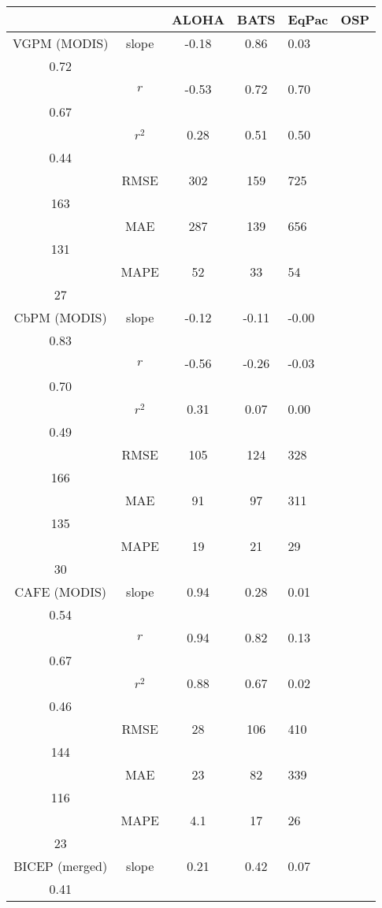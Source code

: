 \begin{table}[h]
\centering
\begin{tabular}{cccc}
\toprule
& & ALOHA & BATS & EqPac & OSP \\
\midrule
VGPM (MODIS) & slope & -0.18 & 0.86 & 0.03 &  \\
0.72 \\
& $r$ & -0.53 & 0.72 & 0.70 &  \\
0.67 \\
& $r^2$ & 0.28 & 0.51 & 0.50 &  \\
0.44 \\
& RMSE & 302 & 159 & 725 &  \\
163 \\
& MAE & 287 & 139 & 656 &  \\
131 \\
& MAPE & 52 & 33 & 54 &  \\
27 \\
\cmidrule(lr){1-6}
CbPM (MODIS) & slope & -0.12 & -0.11 & -0.00 &  \\
0.83 \\
& $r$ & -0.56 & -0.26 & -0.03 &  \\
0.70 \\
& $r^2$ & 0.31 & 0.07 & 0.00 &  \\
0.49 \\
& RMSE & 105 & 124 & 328 &  \\
166 \\
& MAE & 91 & 97 & 311 &  \\
135 \\
& MAPE & 19 & 21 & 29 &  \\
30 \\
\cmidrule(lr){1-6}
CAFE (MODIS) & slope & 0.94 & 0.28 & 0.01 &  \\
0.54 \\
& $r$ & 0.94 & 0.82 & 0.13 &  \\
0.67 \\
& $r^2$ & 0.88 & 0.67 & 0.02 &  \\
0.46 \\
& RMSE & 28 & 106 & 410 &  \\
144 \\
& MAE & 23 & 82 & 339 &  \\
116 \\
& MAPE & 4.1 & 17 & 26 &  \\
23 \\
\cmidrule(lr){1-6}
BICEP (merged) & slope & 0.21 & 0.42 & 0.07 &  \\
0.41 \\

\end{tabular}
\end{table}
